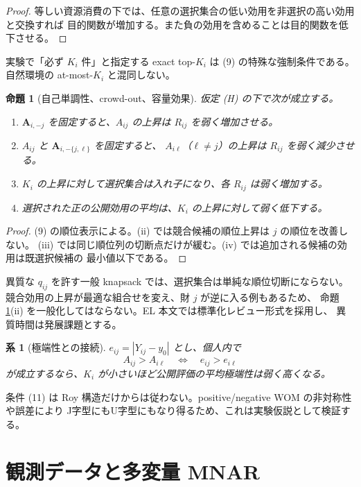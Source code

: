 \documentclass[a4paper,11pt]{ltjsarticle}
\newcommand{\1}{\mathbf 1}
\theoremstyle{definition}
\theoremstyle{plain}
\newtheorem{proposition}{命題}
\newtheorem{corollary}{系}
\theoremstyle{remark}
\begin{document}
\begin{proof}
等しい資源消費の下では、任意の選択集合の低い効用を非選択の高い効用と交換すれば
目的関数が増加する。また負の効用を含めることは目的関数を低下させる。
\end{proof}

実験で「必ず $K_i$ 件」と指定する exact top-$K_i$ は (9) の特殊な強制条件である。
自然環境の at-most-$K_i$ と混同しない。

\begin{proposition}[自己単調性、crowd-out、容量効果]
\label{prop:comparative}
仮定 (H) の下で次が成立する。
\begin{enumerate}[label=(\roman*)]
 \item $\bm A_{i,-j}$ を固定すると、$A_{ij}$ の上昇は $R_{ij}$ を弱く増加させる。
 \item $A_{ij}$ と $\bm A_{i,-\{j,\ell\}}$ を固定すると、
 $A_{i\ell}$（$\ell\ne j$）の上昇は $R_{ij}$ を弱く減少させる。
 \item $K_i$ の上昇に対して選択集合は入れ子になり、各 $R_{ij}$ は弱く増加する。
 \item 選択された正の公開効用の平均は、$K_i$ の上昇に対して弱く低下する。
\end{enumerate}
\end{proposition}

\begin{proof}
(9) の順位表示による。(ii) では競合候補の順位上昇は $j$ の順位を改善しない。
(iii) では同じ順位列の切断点だけが緩む。(iv) では追加される候補の効用は既選択候補の
最小値以下である。
\end{proof}

異質な $q_{ij}$ を許す一般 knapsack では、選択集合は単純な順位切断にならない。
競合効用の上昇が最適な組合せを変え、財 $j$ が逆に入る例もあるため、
命題\ref{prop:comparative}(ii) を一般化してはならない。EL 本文では標準化レビュー形式を採用し、
異質時間は発展課題とする。

\begin{corollary}[極端性との接続]
$e_{ij}=|Y_{ij}-y_0|$ とし、個人内で
\[
 A_{ij}>A_{i\ell}\quad\Longleftrightarrow\quad e_{ij}>e_{i\ell}
 \tag{11}
\]
が成立するなら、$K_i$ が小さいほど公開評価の平均極端性は弱く高くなる。
\end{corollary}

条件 (11) は Roy 構造だけからは従わない。positive/negative WOM の非対称性や誤差により
J字型にもU字型にもなり得るため、これは実験仮説として検証する。

\section{観測データと多変量 MNAR}
\end{document}

